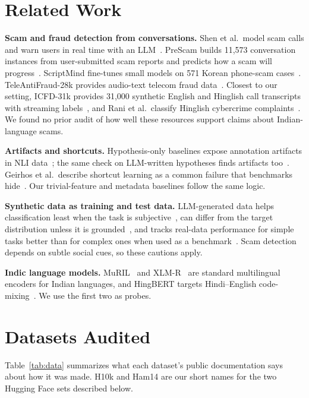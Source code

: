 \documentclass[conference]{IEEEtran}
\begin{document}
\section{Related Work}
\textbf{Scam and fraud detection from conversations.} Shen et al.\ model scam calls and warn users in real time with an LLM~\cite{shen2025warned}. PreScam builds 11{,}573 conversation instances from user-submitted scam reports and predicts how a scam will progress~\cite{sun2026prescam}. ScriptMind fine-tunes small models on 571 Korean phone-scam cases~\cite{kim2026scriptmind}. TeleAntiFraud-28k provides audio-text telecom fraud data~\cite{ma2025teleantifraud}. Closest to our setting, ICFD-31k provides 31{,}000 synthetic English and Hinglish call transcripts with streaming labels~\cite{ahuja2026icfd}, and Rani et al.\ classify Hinglish cybercrime complaints~\cite{rani2024cybercrime}. We found no prior audit of how well these resources support claims about Indian-language scams.

\textbf{Artifacts and shortcuts.} Hypothesis-only baselines expose annotation artifacts in NLI data~\cite{gururangan2018annotation,poliak2018hypothesis}; the same check on LLM-written hypotheses finds artifacts too~\cite{proebsting2024hypothesis}. Geirhos et al.\ describe shortcut learning as a common failure that benchmarks hide~\cite{geirhos2020shortcut}. Our trivial-feature and metadata baselines follow the same logic.

\textbf{Synthetic data as training and test data.} LLM-generated data helps classification least when the task is subjective~\cite{li2023synthetic}, can differ from the target distribution unless it is grounded~\cite{veselovsky2023faithful}, and tracks real-data performance for simple tasks better than for complex ones when used as a benchmark~\cite{maheshwari2024efficacy}. Scam detection depends on subtle social cues, so these cautions apply.

\textbf{Indic language models.} MuRIL~\cite{khanuja2021muril} and XLM-R~\cite{conneau2020xlmr} are standard multilingual encoders for Indian languages, and HingBERT targets Hindi--English code-mixing~\cite{nayak2022hingbert}. We use the first two as probes.

\section{Datasets Audited}
\label{sec:data}
Table~\ref{tab:data} summarizes what each dataset's public documentation says about how it was made. H10k and Ham14 are our short names for the two Hugging Face sets described below.
\end{document}
